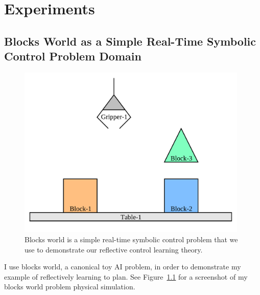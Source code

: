 \chapter{Experiments}\label{ch:experiments}

\section{Blocks World as a Simple Real-Time Symbolic Control Problem Domain}

\begin{figure}[bth]
  \center
  \includegraphics[width=11cm]{gfx/blocks_world_screenshot-1}
  \caption[Blocks world is a simple real-time symbolic control problem.]{Blocks world is a simple real-time symbolic control problem that we use to demonstrate our reflective control learning theory.}
  \label{fig:blocks_world_screenshot-1}
\end{figure}

I use blocks world, a canonical toy AI problem, in order to demonstrate my example of reflectively learning to plan.
See Figure~\ref{fig:blocks_world_screenshot-1} for a screenshot of my blocks world problem physical simulation.

